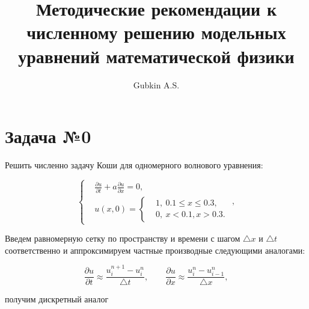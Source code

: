 \documentclass[12pt,a4paper]{article}
\author{Gubkin A.S.}
\title{Методические рекомендации к численному решению модельных уравнений математической физики}
\begin{document}
	\maketitle

    \section*{Задача №0}

		Решить численно задачу Коши для одномерного волнового уравнения:

		\begin{equation}
			\begin{cases}
				& \frac{\partial u}{\partial t} + a \frac{\partial u}{\partial x} = 0, \\
				& u \left( x, 0 \right) =
					\begin{cases}
						& 1, \: 0.1 \leqslant x \leqslant 0.3, \\
						& 0, \: x < 0.1, x > 0.3.
					\end{cases}
			\end{cases},
		\end{equation}

        \begin{center}
        \end{center}

        Введем равномерную сетку по пространству и времени с шагом $\triangle x$ и $\triangle t$ соответственно и аппроксимируем частные производные следующими аналогами:

        \begin{equation}
			\frac{\partial u}{\partial t} \approx \frac{u^{n+1}_{i} - u^{n}_{i}}{\triangle t}, \qquad
			\frac{\partial u}{\partial x} \approx \frac{u^{n}_{i} - u^{n}_{i-1}}{\triangle x},
		\end{equation}

		получим дискретный аналог
		
\end{document}
